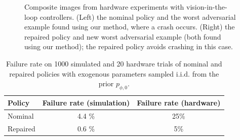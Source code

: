 \begin{figure}[tb]
    \centering
    \caption{Composite images from hardware experiments with vision-in-the-loop controllers. (Left) the nominal policy and the worst adversarial example found using our method, where a crash occurs. (Right) the repaired policy and new worst adversarial example (both found using our method); the repaired policy avoids crashing in this case.}
    \label{ch:corl:fig:hw:car}
\end{figure}

\begin{table}[htb]
    \caption{
        Failure rate on 1000 simulated and 20 hardware trials of nominal and repaired policies with exogenous parameters sampled i.i.d. from the prior $p_{\phi, 0}$.
    }
    \label{ch:corl:tab:hw:metrics}
    \begin{center}
        \begin{tabular}{lcc}
            \toprule
            Policy   & Failure rate (simulation) & Failure rate (hardware) \\
            \midrule
            Nominal  & 4.4 \%                    & 25\%                    \\
            Repaired & 0.6 \%                    & 5\%                     \\
            \bottomrule
        \end{tabular}
    \end{center}
\end{table}

